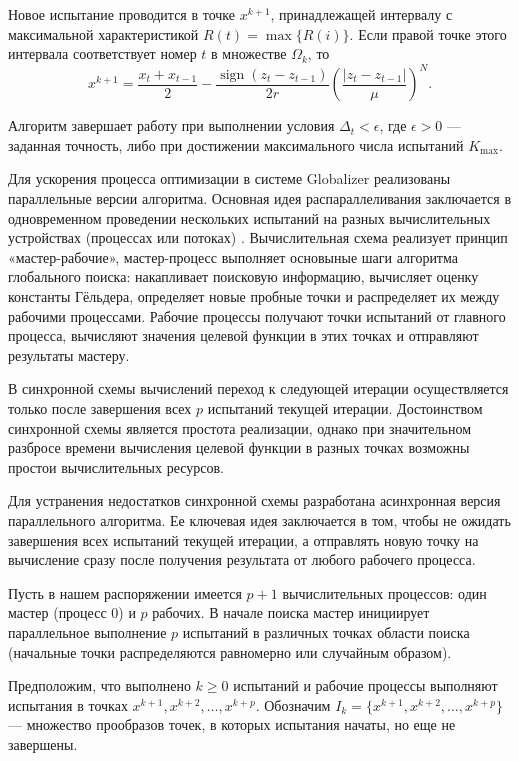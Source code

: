 \documentclass[11pt, oneside, a4paper]{article}
\begin{document}
Новое испытание проводится в точке $x^{k+1}$, принадлежащей интервалу с максимальной характеристикой $R(t) = \max\{R(i)\}$. Если правой точке этого интервала соответствует номер $t$ в множестве $\Omega_k$, то
\begin{equation}
x^{k+1} = \frac{x_t + x_{t-1}}{2} - \frac{\operatorname{sign}(z_t - z_{t-1})}{2r} \left( \frac{|z_t - z_{t-1}|}{\mu} \right)^N. \label{eq_x_new}
\end{equation}

Алгоритм завершает работу при выполнении условия $\Delta_t < \epsilon$, где $\epsilon > 0$ — заданная точность, либо при достижении максимального числа испытаний $K_{\max}$.


Для ускорения процесса оптимизации в системе Globalizer реализованы параллельные версии алгоритма. Основная идея распараллеливания заключается в одновременном проведении нескольких испытаний на разных вычислительных устройствах (процессах или потоках) \cite{Lebedev2022} . Вычислительная схема реализует принцип «мастер-рабочие», мастер-процесс выполняет основыные шаги алгоритма глобального поиска: накапливает поисковую информацию, вычисляет оценку константы Гёльдера, определяет новые пробные точки и распределяет их между рабочими процессами. Рабочие процессы получают точки испытаний от главного процесса, вычисляют значения целевой функции в этих точках и отправляют результаты мастеру.

В синхронной схемы вычислений переход к следующей итерации осуществляется только после завершения всех $p$ испытаний текущей итерации. Достоинством синхронной схемы является простота реализации, однако при значительном разбросе времени вычисления целевой функции в разных точках возможны простои вычислительных ресурсов.

Для устранения недостатков синхронной схемы разработана асинхронная версия параллельного алгоритма. Ее ключевая идея заключается в том, чтобы не ожидать завершения всех испытаний текущей итерации, а отправлять новую точку на вычисление сразу после получения результата от любого рабочего процесса.

Пусть в нашем распоряжении имеется $p+1$ вычислительных процессов: один мастер (процесс 0) и $p$ рабочих. В начале поиска мастер инициирует параллельное выполнение $p$ испытаний в различных точках области поиска (начальные точки распределяются равномерно или случайным образом).

Предположим, что выполнено $k \geq 0$ испытаний и рабочие процессы выполняют испытания в точках $x^{k+1}, x^{k+2}, \ldots, x^{k+p}$. Обозначим $I_k = \{x^{k+1}, x^{k+2}, \ldots, x^{k+p}\}$ — множество прообразов точек, в которых испытания начаты, но еще не завершены.
\end{document}

